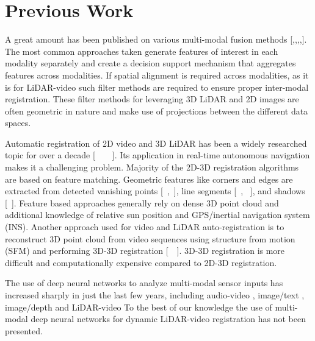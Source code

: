 \documentclass{article}
\begin{document}

\section{Previous Work} %
\label{sec:previous_work}


A great amount has been published on various multi-modal fusion methods [\cite{Ross2003Informatio},\cite{Gregor2011Learning-R},\citeyearpar{Wu2004Optimal-Mu},\citeyearpar{Ross2003Informatio},\cite{Snoek2006The-Challe}]. The most common approaches taken generate features of interest in each modality separately and create a decision support mechanism that aggregates features across modalities. If spatial alignment is required across modalities, as it is for LiDAR-video such filter methods \cite{Thrun2011Googles-dr} are required to ensure proper inter-modal registration. These filter methods for leveraging 3D LiDAR and 2D images are often geometric in nature and make use of projections between the different data spaces. 

Automatic registration of 2D video and 3D LiDAR has been a widely researched topic for over a decade [~\cite{ Wang2009A-Robust-A}~\cite{Kim2014Automatic-}~\cite{Mastin2009Automatic-}~\cite{Bodensteiner2012Real-time-}]. Its application in real-time autonomous navigation makes it a challenging problem. Majority of the 2D-3D registration algorithms are based on feature matching. Geometric features like corners and edges are extracted from detected vanishing points [~\cite{Liu2007-Vanishing-points},~\cite{Ding2008-Vanishing-point}], line segments [~\cite{Frueh2004-Linesegment}, ~\cite{Stamos2008-Linesegment}], and shadows [~\cite{Troccoli2004-ashadow}]. Feature based approaches generally rely on dense 3D point cloud and additional knowledge of relative sun position and GPS/inertial navigation system (INS). Another approach used for video and LiDAR auto-registration is to reconstruct 3D point cloud from video sequences using structure from motion (SFM) and performing 3D-3D registration [~\cite{Zhao2004-alignment-3Dcloud}~\cite{Liu2006-alignment-sfm}]. 3D-3D registration is more difficult and computationally expensive compared to 2D-3D registration. 

The use of deep neural networks to analyze multi-modal sensor inputs  has increased sharply in just the last few years, including audio-video \cite{Ngiam2011Multimodal} \cite{Kim2013Deep-Learn}, image/text \cite{Srivastava2012Multimodal}, image/depth \cite{Lenz2013Deep-Learn} and LiDAR-video To the best of our knowledge the use of multi-modal deep neural networks for dynamic LiDAR-video registration has not been presented.
\end{document}
